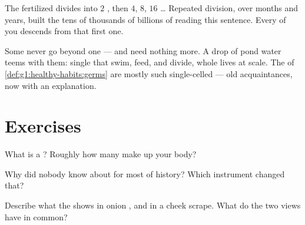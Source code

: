 \begin{example}\label{ex:g5:first-look-at-cells:one}
The fertilized  divides into $2$ , then $4$, $8$,
$16$ \dots{} Repeated division, over months and years, built
the tens of thousands of billions of  reading this
sentence. Every  of you descends from that first one.
\end{example}

\begin{remark}\label{rem:g5:first-look-at-cells:onecelled}
Some  never go beyond one  --- and need
nothing more. A drop of pond water teems with them: single
 that swim, feed, and divide, whole lives at 
scale. The  of \cref{def:g1:healthy-habits:germs} are
mostly such single-celled  --- old acquaintances,
now with an explanation.
\end{remark}

\section{Exercises}

\begin{exercise}[$\star$]\label{exo:g5:first-look-at-cells:1}
What is a ? Roughly how many make up your body?
\end{exercise}

\begin{exercise}[$\star$]\label{exo:g5:first-look-at-cells:2}
Why did nobody know about  for most of history? Which
instrument changed that?
\end{exercise}

\begin{exercise}[$\star$]\label{exo:g5:first-look-at-cells:3}
Describe what the  shows in onion , and in a
cheek scrape. What do the two views have in common?
\end{exercise}


